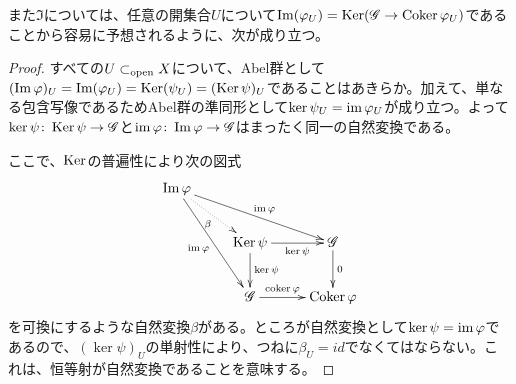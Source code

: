また$\Im$については、任意の開集合$U$について$\operatorname{Im}({\varphi}_U) = \operatorname{Ker}(\mathscr{G} \to \operatorname{Coker} {\varphi}_U)$であることから容易に予想されるように、次が成り立つ。

\begin{proof}
  すべての$U \subset_{\text{open}} X$について、Abel群として$(\operatorname{Im} {\varphi})_U =\operatorname{Im} ({\varphi}_U) = \operatorname{Ker} (\psi_U) = (\operatorname{Ker} \psi)_U$であることはあきらか。加えて、単なる包含写像であるためAbel群の準同形として$\ker \psi_U = \operatorname{im} {\varphi}_U$が成り立つ。よって$\ker \psi \colon \operatorname{Ker} \psi \to \mathscr{G}$と$\operatorname{im} {\varphi} \colon \operatorname{Im} {\varphi} \to \mathscr{G}$はまったく同一の自然変換である。

ここで、$\operatorname{Ker}$の普遍性により次の図式
\[
\xymatrix{
\Im \vp \ar@{.>}[dr]_-{\beta} \ar[drr]^-{\im \vp} \ar[ddr]_-{\im \vp}  & {} & { } \\
{} & \Ker \psi \ar[r]_-{\ker \psi} \ar[d]^-{\ker \psi} & \scrg \ar[d]^-{0} \\
{} & \scrg \ar[r]^-{\coker \vp} & \Coker \vp
}
\]
を可換にするような自然変換$\beta$がある。ところが自然変換として$\ker \psi = \operatorname{im} {\varphi}$であるので、$(\ker \psi)_U$の単射性により、つねに$\beta_U = id$でなくてはならない。これは、恒等射が自然変換であることを意味する。



\end{proof}


